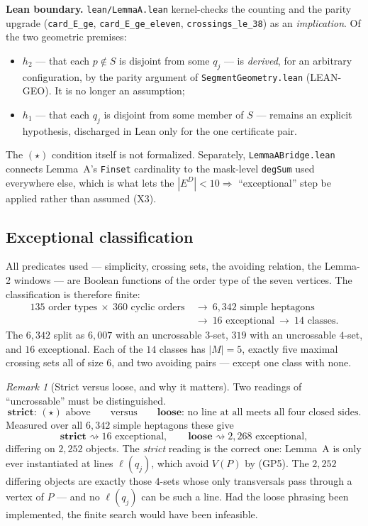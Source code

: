 \documentclass[11pt,a4paper]{article}
\theoremstyle{plain}
\theoremstyle{definition}
\theoremstyle{remark}
\newtheorem*{remark}{Remark}
\newcommand{\ED}{E^{D}}
\begin{document}
\textbf{Lean boundary.} \texttt{lean/}\allowbreak\texttt{LemmaA}\allowbreak\texttt{.lean} kernel-checks the counting and
the parity upgrade (\texttt{card\_E\_ge}, \texttt{card\_E\_ge\_eleven},
\texttt{crossings\_le\_38}) as an \emph{implication}. Of the two geometric
premises:
\begin{itemize}[leftmargin=*,nosep]
  \item $h_2$ --- that each $p\notin S$ is disjoint from some $q_j$ --- is
    \emph{derived}, for an arbitrary configuration, by the parity argument of
    \texttt{SegmentGeometry.lean} (\textsf{LEAN-GEO}). It is no longer an
    assumption;
  \item $h_1$ --- that each $q_j$ is disjoint from some member of $S$ --- remains
    an explicit hypothesis, discharged in Lean only for the one certificate pair.
\end{itemize}
The $(\star)$ condition itself is not formalized. Separately,
\texttt{LemmaABridge.lean} connects Lemma~A's \texttt{Finset} cardinality to the
mask-level \texttt{degSum} used everywhere else, which is what lets the
$|\ED|<10\Rightarrow$ ``exceptional'' step be applied rather than assumed
(\textsf{X3}).

\subsection{Exceptional classification}\label{sec:exc}

All predicates used --- simplicity, crossing sets, the avoiding relation, the
Lemma-2 windows --- are Boolean functions of the order type of the seven
vertices. The classification is therefore finite:
\[
\begin{aligned}
  135 \text{ order types}\ \times\ 360 \text{ cyclic orders}
  &\ \longrightarrow\ 6{,}342 \text{ simple heptagons} \\
  &\ \longrightarrow\ 16 \text{ exceptional}
  \ \longrightarrow\ 14 \text{ classes}.
\end{aligned}
\]
The $6{,}342$ split as $6{,}007$ with an uncrossable $3$-set, $319$ with an
uncrossable $4$-set, and $16$ exceptional. Each of the $14$ classes has
$|M|=5$, exactly five maximal crossing sets all of size $6$, and two avoiding
pairs --- except one class with none.

\begin{remark}[Strict versus loose, and why it matters]\label{rem:strict}
Two readings of ``uncrossable'' must be distinguished.
\[
  \textbf{strict: } (\star) \text{ above}
  \qquad\text{versus}\qquad
  \textbf{loose: } \text{no line at all meets all four closed sides.}
\]
Measured over all $6{,}342$ simple heptagons these give
\[
  \textbf{strict} \rightsquigarrow 16 \text{ exceptional},
  \qquad
  \textbf{loose} \rightsquigarrow 2{,}268 \text{ exceptional},
\]
differing on $2{,}252$ objects. The \emph{strict} reading is the correct one:
Lemma~A is only ever instantiated at lines $\ell(q_j)$, which avoid $V(P)$ by
(GP5). The $2{,}252$ differing objects are exactly those $4$-sets whose only
transversals pass through a vertex of $P$ --- and no $\ell(q_j)$ can be such a
line. Had the loose phrasing been implemented, the finite search would have been
infeasible.
\end{remark}
\end{document}
